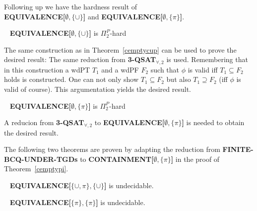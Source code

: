 Following up we have the hardness result of\\
\textbf{EQUIVALENCE[$\emptyset,\{\cup\}$]} and
\textbf{EQUIVALENCE[$\emptyset,\{\pi\}$]}.
\begin{theorem}~\cite{pichler2014containment}
	\textbf{EQUIVALENCE[$\emptyset,\{\cup\}$]} is $\Pi_2^P$-hard
\end{theorem}
\begin{proofidea}
The same construction as in Theorem~\ref{cemptycup} can be used to prove the
desired result: The same reduction from \textbf{3-QSAT$_{\forall,2}$} is used.
Remembering that in this construction a wdPT $T_1$ and a wdPF $F_2$ such that
$\phi$ is valid iff  $T_1 \subseteq F_2$ holds is constructed.
One can not only show $T_1 \subseteq F_2$ but also $T_1 \supseteq F_2$ (iff $\phi$ is
valid of course). This
argumentation yields the desired result.
\end{proofidea}

\begin{theorem}~\cite{pichler2014containment}
	\textbf{EQUIVALENCE[$\emptyset,\{\pi\}$]} is $\Pi_2^P$-hard
\end{theorem}
\begin{proofidea}
	A reducion from \textbf{3-QSAT$_{\forall,2}$} to
	\textbf{EQUIVALENCE[$\emptyset,\{\pi\}$]}
is needed to obtain the desired result.
\end{proofidea}

The following two theorems are proven by adapting the reduction from
\textbf{FINITE-BCQ-UNDER-TGDs} to \textbf{CONTAINMENT[$\emptyset,\{\pi\}$]} in the proof of 
Theorem~\ref{cemptypi}.
\begin{theorem}~\cite{pichler2014containment}
	\textbf{EQUIVALENCE[$\{\cup,\pi\},\{\cup\}$]} is undecidable.
\end{theorem}
\begin{theorem}~\cite{pichler2014containment}
	\textbf{EQUIVALENCE[$\{\pi\},\{\pi\}$]} is undecidable.
\end{theorem}
